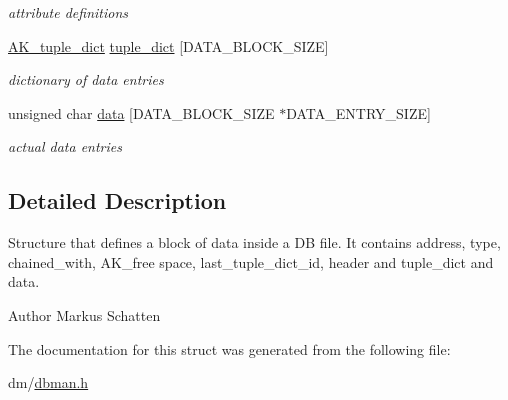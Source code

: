 \begin{DoxyCompactItemize}
\begin{DoxyCompactList}\small\item\em attribute definitions \end{DoxyCompactList}\item 
\hypertarget{structAK__block_ad5eaa0ebdbeee5d5083d185c8b9ac3b4}{\hyperlink{structAK__tuple__dict}{A\+K\+\_\+tuple\+\_\+dict} \hyperlink{structAK__block_ad5eaa0ebdbeee5d5083d185c8b9ac3b4}{tuple\+\_\+dict} \mbox{[}D\+A\+T\+A\+\_\+\+B\+L\+O\+C\+K\+\_\+\+S\+I\+Z\+E\mbox{]}}\label{structAK__block_ad5eaa0ebdbeee5d5083d185c8b9ac3b4}

\begin{DoxyCompactList}\small\item\em dictionary of data entries \end{DoxyCompactList}\item 
\hypertarget{structAK__block_af66ba2bcc5d90ff18f09982975efb913}{unsigned char \hyperlink{structAK__block_af66ba2bcc5d90ff18f09982975efb913}{data} \mbox{[}D\+A\+T\+A\+\_\+\+B\+L\+O\+C\+K\+\_\+\+S\+I\+Z\+E $\ast$D\+A\+T\+A\+\_\+\+E\+N\+T\+R\+Y\+\_\+\+S\+I\+Z\+E\mbox{]}}\label{structAK__block_af66ba2bcc5d90ff18f09982975efb913}

\begin{DoxyCompactList}\small\item\em actual data entries \end{DoxyCompactList}\end{DoxyCompactItemize}


\subsection{Detailed Description}
Structure that defines a block of data inside a D\+B file. It contains address, type, chained\+\_\+with, A\+K\+\_\+free space, last\+\_\+tuple\+\_\+dict\+\_\+id, header and tuple\+\_\+dict and data. 

\begin{DoxyAuthor}{Author}
Markus Schatten 
\end{DoxyAuthor}


The documentation for this struct was generated from the following file\+:\begin{DoxyCompactItemize}
\item 
dm/\hyperlink{dbman_8h}{dbman.\+h}\end{DoxyCompactItemize}
